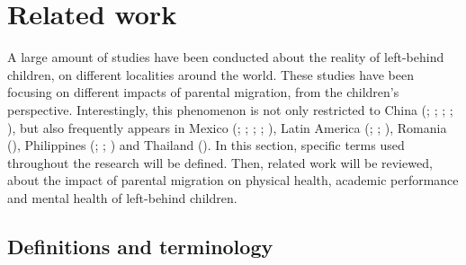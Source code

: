 \section{Related work}
\label{related-work}

A large amount of studies have been conducted about the reality of left-behind children, on different localities around the world. These studies have been focusing on different impacts of parental migration, from the children's perspective. Interestingly, this phenomenon is not only restricted to China (\cite{song2009health}; \cite{he2012depression}; \cite{guo2017effect}; \cite{fan2010emotional}; \cite{bai2017effect}), but also frequently appears in Mexico (\cite{sawyer2016money}; \cite{kanaiaupuni2000reframing}; \cite{hildebrandt2005effects}; \cite{fernandez1998fathers}; \cite{dreby2007children}), Latin America (\cite{mundial2006development}; \cite{acosta2007impact}; \cite{anton2010impact}), Romania (\cite{botezat2014impact}), Philippines (\cite{yang2008international}; \cite{cortes2015feminization}; \cite{arguillas2010impact}) and Thailand (\cite{jampaklay2006parental}). In this section, specific terms used throughout the research will be defined. Then, related work will be reviewed, about the impact of parental migration on physical health, academic performance and mental health of left-behind children. 

\subsection{Definitions and terminology}

